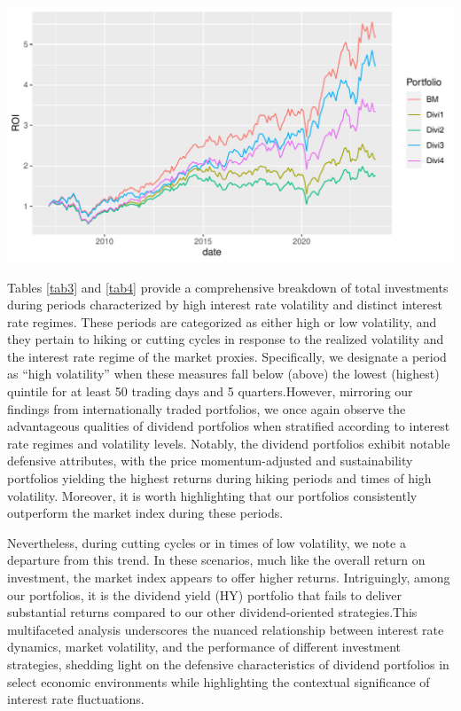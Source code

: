 \documentclass[12pt,preprint, authoryear]{elsarticle}
\let\origfigure\figure
\let\endorigfigure\endfigure
\renewenvironment{figure}[1][2] {
    \expandafter\origfigure\expandafter[H]
} {
    \endorigfigure
}
\numberwithin{equation}{section}
\numberwithin{figure}{section}
\numberwithin{table}{section}
\begin{document}
\begin{figure}[H]

\includegraphics{Much_Ado_About_Dividends_files/figure-latex/Figure3-1} \hfill{}

\caption{Rolling 3 Year Returns \label{fig3}}\label{fig:Figure3}
\end{figure}

Tables \ref{tab3} and \ref{tab4} provide a comprehensive breakdown of
total investments during periods characterized by high interest rate
volatility and distinct interest rate regimes. These periods are
categorized as either high or low volatility, and they pertain to hiking
or cutting cycles in response to the realized volatility and the
interest rate regime of the market proxies. Specifically, we designate a
period as ``high volatility'' when these measures fall below (above) the
lowest (highest) quintile for at least 50 trading days and 5
quarters.However, mirroring our findings from internationally traded
portfolios, we once again observe the advantageous qualities of dividend
portfolios when stratified according to interest rate regimes and
volatility levels. Notably, the dividend portfolios exhibit notable
defensive attributes, with the price momentum-adjusted and
sustainability portfolios yielding the highest returns during hiking
periods and times of high volatility. Moreover, it is worth highlighting
that our portfolios consistently outperform the market index during
these periods.

Nevertheless, during cutting cycles or in times of low volatility, we
note a departure from this trend. In these scenarios, much like the
overall return on investment, the market index appears to offer higher
returns. Intriguingly, among our portfolios, it is the dividend yield
(HY) portfolio that fails to deliver substantial returns compared to our
other dividend-oriented strategies.This multifaceted analysis
underscores the nuanced relationship between interest rate dynamics,
market volatility, and the performance of different investment
strategies, shedding light on the defensive characteristics of dividend
portfolios in select economic environments while highlighting the
contextual significance of interest rate fluctuations.
\end{document}
